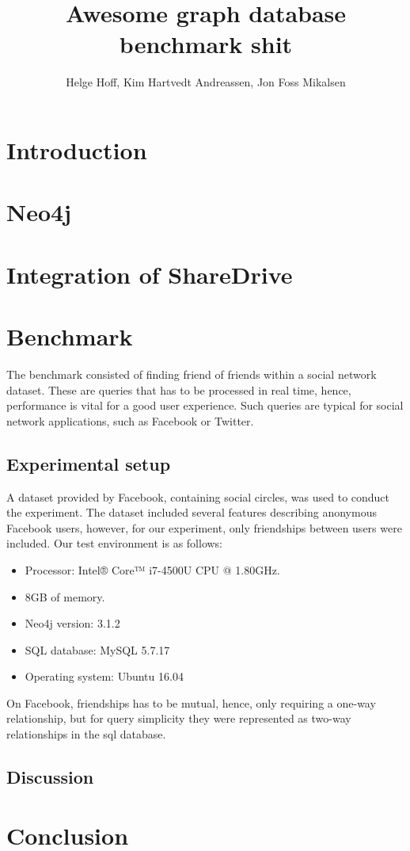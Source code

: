 \documentclass[a4paper, 12pt, conference]{IEEEtran}
\def \thetitle {Awesome graph database benchmark shit}
\def \theauthor {Helge Hoff, Kim Hartvedt Andreassen, Jon Foss Mikalsen}
\begin{document}
\title{\thetitle}
\author{\theauthor}

\maketitle
\thispagestyle{plain}

 
\IEEEpeerreviewmaketitle

\section{Introduction}

\section{Neo4j}
\section{Integration of ShareDrive}
\section{Benchmark}
The benchmark consisted of finding friend of friends within a social network dataset.
These are queries that has to be processed in real time, hence, performance is vital for a good user experience.
Such queries are typical for social network applications, such as Facebook or Twitter.
\subsection{Experimental setup}
A dataset provided by Facebook, containing social circles, was used to conduct the experiment.
The dataset included several features describing anonymous Facebook users, however, for our experiment, only friendships between users were included.
Our test environment is as follows: 
\begin{itemize}
	\item Processor: Intel® Core™ i7-4500U CPU @ 1.80GHz.
	\item 8GB of memory. 
	\item Neo4j version: 3.1.2
	\item SQL database: MySQL 5.7.17
	\item Operating system: Ubuntu 16.04
\end{itemize}
On Facebook, friendships has to be mutual, hence, only requiring a one-way relationship, but for query simplicity they were represented as two-way relationships in the sql database.

\subsection{Discussion}


\section{Conclusion}




%
%
\end{document}
